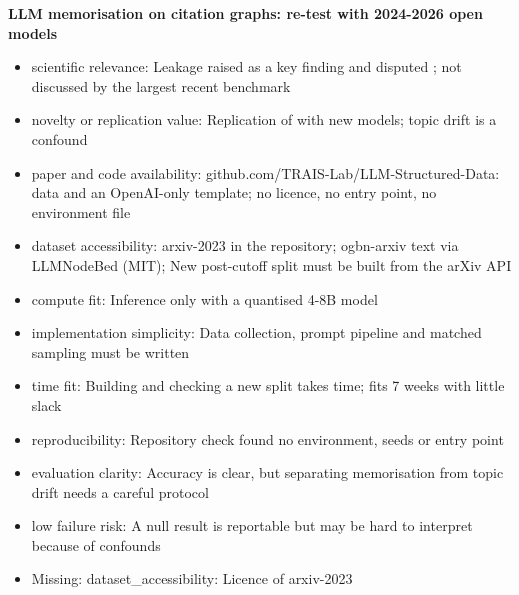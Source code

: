 \documentclass[11pt,a4paper]{article}
\begin{document}
\textbf{LLM memorisation on citation graphs: re-test with 2024-2026 open models}
\begin{itemize}
\item scientific relevance: Leakage raised as a key finding \cite{chen2024exploring} and disputed \cite{huang2023leakage}; not discussed by the largest recent benchmark \cite{wu2025llmnodebed}
\item novelty or replication value: Replication of \cite{huang2023leakage} with new models; topic drift is a confound
\item paper and code availability: github.com/TRAIS-Lab/LLM-Structured-Data: data and an OpenAI-only template; no licence, no entry point, no environment file
\item dataset accessibility: arxiv-2023 in the repository; ogbn-arxiv text via LLMNodeBed (MIT); New post-cutoff split must be built from the arXiv API
\item compute fit: Inference only with a quantised 4-8B model
\item implementation simplicity: Data collection, prompt pipeline and matched sampling must be written
\item time fit: Building and checking a new split takes time; fits 7 weeks with little slack
\item reproducibility: Repository check found no environment, seeds or entry point
\item evaluation clarity: Accuracy is clear, but separating memorisation from topic drift needs a careful protocol
\item low failure risk: A null result is reportable but may be hard to interpret because of confounds
\item Missing: dataset\_accessibility: Licence of arxiv-2023
\end{itemize}
\end{document}
